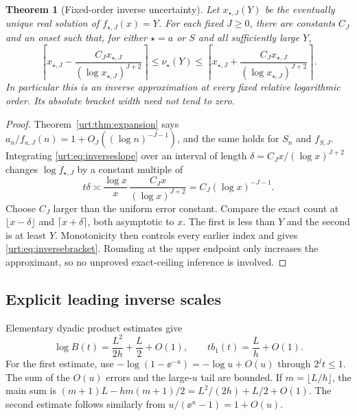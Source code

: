 \documentclass[11pt,letterpaper]{article}
\newtheorem{theorem}{Theorem}[section]
\theoremstyle{remark}\newtheorem{remark}[theorem]{Remark}
\begin{document}
\begin{theorem}[Fixed-order inverse uncertainty]\label{urt:thm:inverse}
Let $x_{\star,J}(Y)$ be the eventually unique real solution of $f_{\star,J}(x)=Y$. For each fixed $J\ge0$, there are constants $C_J$ and an onset such that, for either $\star=a$ or $S$ and all sufficiently large $Y$,
\begin{equation}\label{urt:eq:inversebracket}
 \left\lceil x_{\star,J}-\frac{C_Jx_{\star,J}}{(\log x_{\star,J})^{J+2}}\right\rceil
 \le\nu_\star(Y)\le
 \left\lceil x_{\star,J}+\frac{C_Jx_{\star,J}}{(\log x_{\star,J})^{J+2}}\right\rceil.
\end{equation}
In particular this is an inverse approximation at every fixed relative logarithmic order. Its absolute bracket width need not tend to zero.
\end{theorem}
\begin{proof}
Theorem~\ref{urt:thm:expansion} says $a_n/f_{a,J}(n)=1+O_J((\log n)^{-J-1})$, and the same holds for $S_n$ and $f_{S,J}$. Integrating \eqref{urt:eq:inverseslope} over an interval of length $\delta=C_Jx/(\log x)^{J+2}$ changes $\log f_{\star,J}$ by a constant multiple of
\[
 t\delta\asymp\frac{\log x}{x}\,\frac{C_Jx}{(\log x)^{J+2}}
       =C_J(\log x)^{-J-1}.
\]
Choose $C_J$ larger than the uniform error constant. Compare the exact count at $\lfloor x-\delta\rfloor$ and $\lceil x+\delta\rceil$, both asymptotic to $x$. The first is less than $Y$ and the second is at least $Y$. Monotonicity then controls every earlier index and gives \eqref{urt:eq:inversebracket}. Rounding at the upper endpoint only increases the approximant, so no unproved exact-ceiling inference is involved.
\end{proof}

\subsection{Explicit leading inverse scales}
Elementary dyadic product estimates give
\begin{equation}\label{urt:eq:logB}
 \log B(t)=\frac{L^2}{2h}+\frac L2+O(1),\qquad tb_1(t)=\frac Lh+O(1).
\end{equation}
For the first estimate, use $-\log(1-\ee^{-u})=-\log u+O(u)$ through $2^jt\le1$. The sum of the $O(u)$ errors and the large-$u$ tail are bounded. If $m=\lfloor L/h\rfloor$, the main sum is $(m+1)L-hm(m+1)/2=L^2/(2h)+L/2+O(1)$. The second estimate follows similarly from $u/(\ee^u-1)=1+O(u)$.
\end{document}
